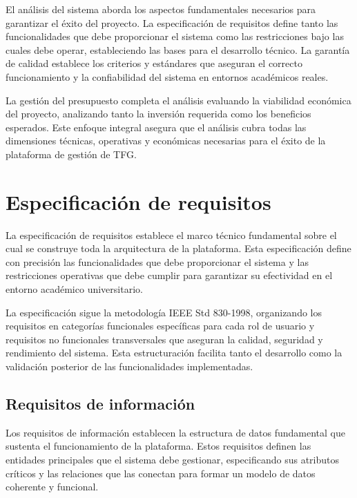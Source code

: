 \documentclass[12pt,a4paper,oneside]{report}
\begin{document}
El análisis del sistema aborda los aspectos fundamentales necesarios para garantizar el éxito del proyecto. La especificación de requisitos define tanto las funcionalidades que debe proporcionar el sistema como las restricciones bajo las cuales debe operar, estableciendo las bases para el desarrollo técnico. La garantía de calidad establece los criterios y estándares que aseguran el correcto funcionamiento y la confiabilidad del sistema en entornos académicos reales.

La gestión del presupuesto completa el análisis evaluando la viabilidad económica del proyecto, analizando tanto la inversión requerida como los beneficios esperados. Este enfoque integral asegura que el análisis cubra todas las dimensiones técnicas, operativas y económicas necesarias para el éxito de la plataforma de gestión de TFG.

\section{Especificación de
requisitos}\label{especificaciuxf3n-de-requisitos}

La especificación de requisitos establece el marco técnico fundamental sobre el cual se construye toda la arquitectura de la plataforma. Esta especificación define con precisión las funcionalidades que debe proporcionar el sistema y las restricciones operativas que debe cumplir para garantizar su efectividad en el entorno académico universitario.

La especificación sigue la metodología IEEE Std 830-1998, organizando los requisitos en categorías funcionales específicas para cada rol de usuario y requisitos no funcionales transversales que aseguran la calidad, seguridad y rendimiento del sistema. Esta estructuración facilita tanto el desarrollo como la validación posterior de las funcionalidades implementadas.

\subsection{Requisitos de
información}\label{requisitos-de-informaciuxf3n}

Los requisitos de información establecen la estructura de datos fundamental que sustenta el funcionamiento de la plataforma. Estos requisitos definen las entidades principales que el sistema debe gestionar, especificando sus atributos críticos y las relaciones que las conectan para formar un modelo de datos coherente y funcional.
\end{document}
